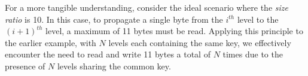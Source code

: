 For a more tangible understanding, consider the ideal scenario where the \textit{size ratio} is 10. In this case, to 
propagate a single byte from the $i^{th}$ level to the $(i+1)^{th}$ level, a maximum of 11 bytes must be read.
Applying this principle to the earlier example, with $N$ levels each containing the same key, we effectively encounter 
the need to read and write 11 bytes a total of $N$ times due to the presence of $N$ levels sharing the common key.